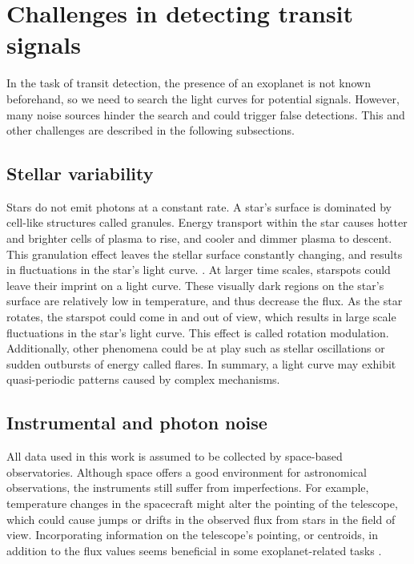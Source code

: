 
\section{Challenges in detecting transit signals}
\label{sec:challenges}

In the task of transit detection, the presence of an exoplanet is not known beforehand, 
so we need to search the light curves for potential signals. However, many noise sources hinder the search and could trigger false detections. This and other challenges are described in the following subsections.

\subsection{Stellar variability}
Stars do not emit photons at a constant rate. A star's surface is dominated by cell-like structures called granules. Energy transport within the star causes hotter and brighter cells of plasma to rise, and cooler and dimmer plasma to descent. This granulation effect leaves the stellar surface constantly changing, and results in fluctuations in the star’s light curve. . At larger time scales, starspots could leave their imprint on a light curve. These visually dark regions on the star's surface are relatively low in temperature, and thus decrease the flux. As the star rotates, the starspot could come in and out of view, which results in large scale fluctuations in the star’s light curve. This effect is called rotation modulation. Additionally, other phenomena could be at play such as stellar oscillations or sudden outbursts of energy called flares. In summary, a light curve may exhibit quasi-periodic patterns caused by complex mechanisms.

\subsection{Instrumental and photon noise}
All data used in this work is assumed to be collected by space-based observatories. Although space offers a good environment for astronomical observations, the instruments still suffer from imperfections. For example, temperature changes in the spacecraft might alter the pointing of the telescope, which could cause jumps or drifts in the observed flux from stars in the field of view. Incorporating information on the telescope’s pointing, or centroids, in addition to the flux values seems beneficial in some exoplanet-related tasks . 

